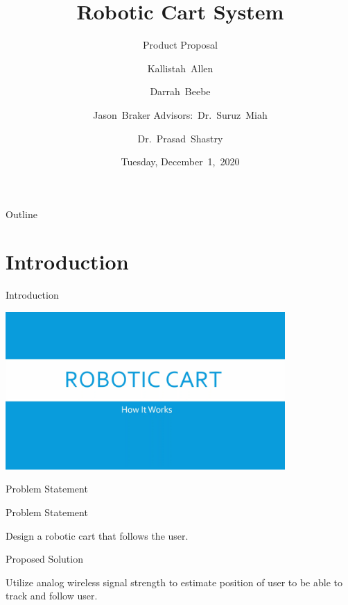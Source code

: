 \documentclass{beamer}
\title[Robotic Cart System (Proposal)]{Robotic Cart System}
\subtitle{Product Proposal}
\author[K.~Allen, D.~Beebe, J.~Braker]{Kallistah~Allen \and Darrah~Beebe \and
Jason~Braker
Advisors:~Dr.~Suruz~Miah \and Dr.~Prasad~Shastry}
\institute[Bradley University] %
{
  Department of Electrical and Computer Engineering\\
  Bradley University\\
  1501 W. Bradley Avenue\\
  Peoria, IL, 61625, USA
}
\date[December~1,~2020]{Tuesday, December~1,~2020}
\begin{document}
\begin{frame}
  \titlepage
\end{frame}

\begin{frame}{Outline} 
  \tableofcontents%
\end{frame}

\section{Introduction}

\begin{frame}{Introduction}
  \begin{center}
    \href{videos/proposalVideo.mp4}{\includegraphics[width=0.8\textwidth]{figs/img/proposalVideoTitle}}
  \end{center}
\end{frame}

\begin{frame}{Problem Statement}
  \begin{block}{Problem Statement}
    \begin{LARGE}
      Design a robotic cart that follows the user.
    \end{LARGE}
  \end{block}
  \pause
  \begin{block}{Proposed Solution}
    \begin{LARGE}
      Utilize analog wireless signal strength to estimate position of user to be able to track and follow user.
    \end{LARGE}
  \end{block}
\end{frame}
\end{document}
